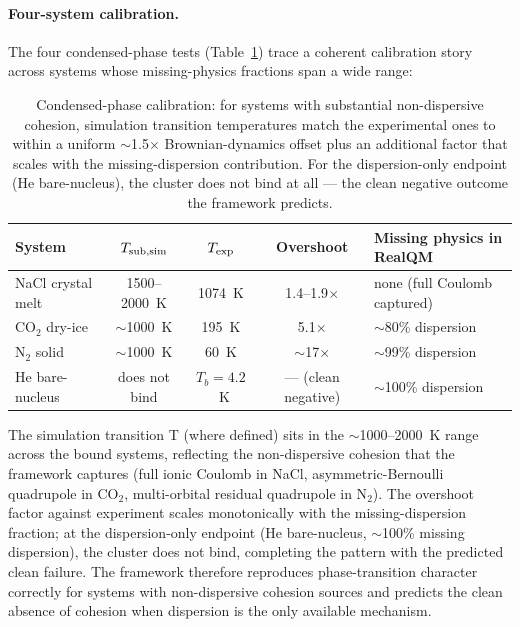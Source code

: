 \documentclass[11pt]{article}
\begin{document}
\paragraph{Four-system calibration.}
The four condensed-phase tests (Table~\ref{tab:condensed}) trace a coherent calibration story across systems whose missing-physics fractions span a wide range:

\begin{table}[h!]
\centering
\small
\begin{tabular}{l c c c l}
\toprule
\textbf{System} & $T_{\rm sub,sim}$ & $T_{\rm exp}$ & \textbf{Overshoot} & \textbf{Missing physics in RealQM} \\
\midrule
NaCl crystal melt    & 1500--2000~K & 1074~K & 1.4--1.9$\times$ & none (full Coulomb captured) \\
CO$_2$ dry-ice       & $\sim$1000~K & 195~K  & 5.1$\times$       & $\sim$80\% dispersion \\
N$_2$ solid          & $\sim$1000~K & 60~K   & $\sim$17$\times$  & $\sim$99\% dispersion \\
He bare-nucleus      & does not bind & $T_b = 4.2$~K & --- (clean negative)  & $\sim$100\% dispersion \\
\bottomrule
\end{tabular}
\caption{Condensed-phase calibration: for systems with substantial non-dispersive cohesion, simulation transition temperatures match the experimental ones to within a uniform $\sim$1.5$\times$ Brownian-dynamics offset plus an additional factor that scales with the missing-dispersion contribution. For the dispersion-only endpoint (He bare-nucleus), the cluster does not bind at all --- the clean negative outcome the framework predicts.}
\label{tab:condensed}
\end{table}

The simulation transition T (where defined) sits in the $\sim$1000--2000~K range across the bound systems, reflecting the non-dispersive cohesion that the framework captures (full ionic Coulomb in NaCl, asymmetric-Bernoulli quadrupole in CO$_2$, multi-orbital residual quadrupole in N$_2$). The overshoot factor against experiment scales monotonically with the missing-dispersion fraction; at the dispersion-only endpoint (He bare-nucleus, $\sim$100\% missing dispersion), the cluster does not bind, completing the pattern with the predicted clean failure. The framework therefore reproduces phase-transition character correctly for systems with non-dispersive cohesion sources and predicts the clean absence of cohesion when dispersion is the only available mechanism.
\end{document}
